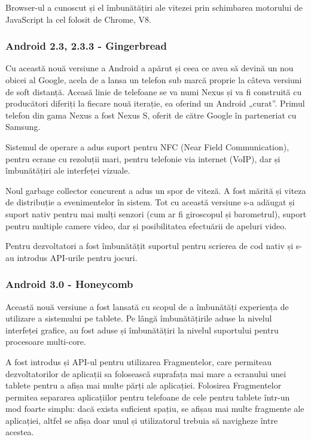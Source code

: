 \documentclass[12pt,a4paper]{article}
\begin{document}
	Browser-ul a cunoscut și el îmbunătățiri ale vitezei prin schimbarea motorului de JavaScript la cel folosit de Chrome, V8.


\subsubsection{Android 2.3, 2.3.3 - Gingerbread}
Cu această nouă versiune a Android a apărut și ceea ce avea să devină un nou obicei al Google, acela de a lansa un telefon sub marcă proprie la câteva versiuni de soft distanță. Aceasă linie de telefoane se va numi Nexus și va fi construită cu producători diferiți la fiecare nouă iterație, ea oferind un Android „curat”. Primul telefon din gama Nexus a fost Nexus S, oferit de către Google în parteneriat cu Samsung.

	Sistemul de operare a adus suport pentru NFC (Near Field Communication), pentru ecrane cu rezoluții mari, pentru telefonie via internet (VoIP), dar și îmbunătățiri ale interfeței vizuale.

	Noul garbage collector concurent a adus un spor de viteză. A fost mărită și viteza de distribuție a evenimentelor în sistem. Tot cu această versiune s-a adăugat și suport nativ pentru mai mulți senzori (cum ar fi giroscopul și barometrul), suport pentru multiple camere video, dar și posibilitatea efectuării de apeluri video.

	Pentru dezvoltatori a fost îmbunătățit suportul pentru scrierea de cod nativ și s-au introdus API-urile pentru jocuri.


\subsubsection{Android 3.0 - Honeycomb}
Această nouă versiune a fost lansată cu scopul de a îmbunătăți experiența de utilizare a sistemului pe tablete. Pe lângă îmbunătățirile aduse la nivelul interfeței grafice, au fost aduse și îmbunătățiri la nivelul suportului pentru procesoare multi-core.

	A fost introdus și API-ul pentru utilizarea Fragmentelor, care permiteau dezvoltatorilor de aplicații sa folosească suprafața mai mare a ecranului unei tablete pentru a afișa mai multe părți ale aplicației. Folosirea Fragmentelor permitea separarea aplicațiilor pentru telefoane de cele pentru tablete într-un mod foarte simplu: dacă exista suficient spațiu, se afișau mai multe fragmente ale aplicației, altfel se afișa doar unul și utilizatorul trebuia să navigheze între acestea.
\end{document}
